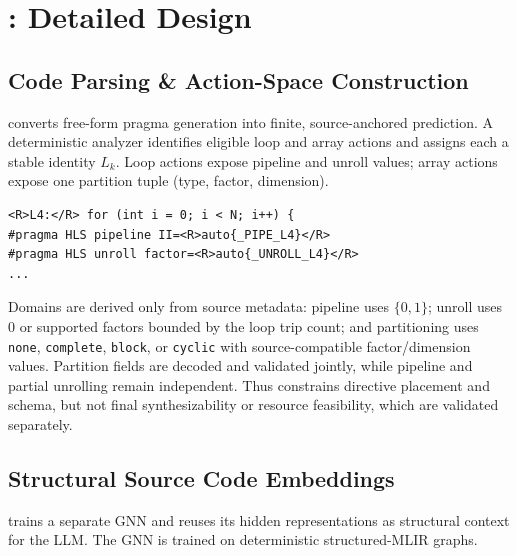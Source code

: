 \section{\framework: Detailed Design}
\label{sec:detailed-design}


\subsection{Code Parsing \& Action-Space Construction}
\label{subsec:parsing}

\framework converts free-form pragma generation into finite, source-anchored prediction. A deterministic analyzer identifies eligible loop and array actions and assigns each a stable identity $L_k$. Loop actions expose pipeline and unroll values; array actions expose one partition tuple (type, factor, dimension).

\begin{lstlisting}[style=shortlststyle]
<R>L4:</R> for (int i = 0; i < N; i++) {
#pragma HLS pipeline II=<R>auto{_PIPE_L4}</R>
#pragma HLS unroll factor=<R>auto{_UNROLL_L4}</R>
...
\end{lstlisting}

Domains are derived only from source metadata: pipeline uses $\{0,1\}$; unroll uses 0 or supported factors bounded by the loop trip count; and partitioning uses \texttt{none}, \texttt{complete}, \texttt{block}, or \texttt{cyclic} with source-compatible factor/dimension values. Partition fields are decoded and validated jointly, while pipeline and partial unrolling remain independent. Thus \framework constrains directive placement and schema, but not final synthesizability or resource feasibility, which are validated
separately.



\subsection{Structural Source Code Embeddings}
\label{subsec:structural-embeddings}

\framework trains a separate GNN and reuses its hidden representations as structural context for the LLM. The GNN is trained on deterministic structured-MLIR graphs.


